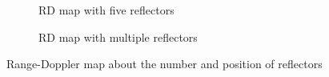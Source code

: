 \documentclass[12pt,DIV14,BCOR12mm,a4paper,footinclude=false,headinclude,parskip=half-,twoside,openright,cleardoublepage=empty,toc=index,bibliography=totoc,listof=totoc]{scrreprt}
\numberwithin{equation}{chapter}
\begin{document}
\begin{figure}[t]
    \centering
    \begin{subfigure}{0.45\textwidth}
        \centering
        \caption{RD map with five reflectors}
    \end{subfigure}\hspace{0.5cm}
    \begin{subfigure}{0.45\textwidth}
        \centering
        \caption{RD map with multiple reflectors}
    \end{subfigure}
    \caption{Range-Doppler map about the number and position of reflectors}
    \label{range doppler map about the number and position of reflectors}
\end{figure}
\end{document}
